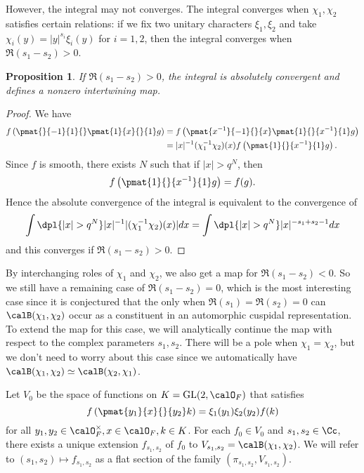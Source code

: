 \documentclass{article}
\newcommand{\GL}{\mathrm{GL}}
\newtheorem{proposition}{Proposition}[section]
\begin{document}
However, the integral may not converges. The integral converges when $\chi_1, \chi_2$ satisfies certain relations: if we fix two unitary characters $\xi_1, \xi_2$ and take $\chi_i(y) = |y|^{s_i}\xi_i(y)$ for $i = 1,2$, then the integral converges when $\Re(s_1 - s_2) >0$. 
\begin{proposition}
If $\Re(s_1 - s_2) >0$, the integral is absolutely convergent and defines a nonzero intertwining map. 
\end{proposition}
\begin{proof}
We have
\begin{align*}
f\left(\pmat{}{-1}{1}{}\pmat{1}{x}{}{1}g\right) &= f\left( \pmat{x^{-1}}{-1}{}{x} \pmat{1}{}{x^{-1}}{1} g\right) \\
&= |x|^{-1}(\chi_{1}^{-1}\chi_{2})(x) f\left( \pmat{1}{}{x^{-1}}{1}g\right).
\end{align*}
Since $f$ is smooth, there exists $N$ such that if $|x|>q^N$, then $$f\left( \pmat{1}{}{x^{-1}}{1}g\right) = f(g).$$ 
Hence the absolute convergence of the integral is equivalent to the convergence of 
$$
\int\dpl{|x|>q^N} |x|^{-1}|(\chi_{1}^{-1}\chi_{2})(x)| dx = \int\dpl{|x|>q^N} |x|^{-s_{1} + s_{2} - 1} dx
$$
and this converges if $\Re(s_1 - s_2) >0$. 
\end{proof}
By interchanging roles of $\chi_1$ and $\chi_2$, we also get a map for $\Re(s_1 - s_2) <0$. 
So we still have a remaining case of $\Re(s_1 - s_2) =0$, which is the most interesting case since it is conjectured that the only when $\Re(s_1) = \Re(s_2) = 0$ can $\calB(\chi_1, \chi_2)$ occur as a constituent in an automorphic cuspidal representation. 
To extend the map for this case, we will analytically continue the map with respect to the complex parameters $s_1, s_2$. There will be a pole when $\chi_1 = \chi_2$, but we don't need to worry about this case since we automatically have $\calB(\chi_1, \chi_2) \simeq \calB(\chi_2, \chi_1)$. 

Let $V_0$ be the space of functions on $K = \GL(2, \calO_F)$ that satisfies
$$
f\left( \pmat{y_{1}}{x}{}{y_{2}}k\right) = \xi_1(y_1)\xi_2(y_2)f(k)
$$
for all $y_1, y_2\in \calO^{\times}_F, x\in \calO_F, k\in K$. For each $f_{0}\in V_{0}$ and $s_1, s_2\in\Cc$, there exists a unique extension $f_{s_{1}, s_{2}}$ of $f_{0}$ to $V_{s_{1}, s_{2}} = \calB(\chi_{1}, \chi_{2})$. We will refer to $(s_{1}, s_{2}) \mapsto f_{s_{1}, s_{2}}$ as a flat section of the family $(\pi_{s_{1}, s_{2}}, V_{s_{1}, s_{2}})$. 
\end{document}
